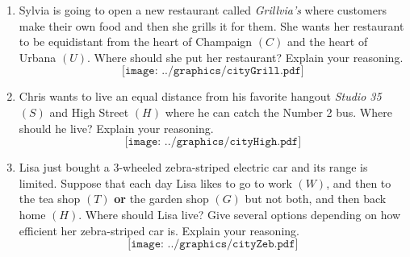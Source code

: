\begin{problems}
\begin{enumerate}
\item Sylvia is going to open a new restaurant called
  \textit{Grillvia's} where customers make their own food and then she
  grills it for them. She wants her restaurant to be equidistant from
  the heart of Champaign $(C)$ and the heart of Urbana $(U)$. Where
  should she put her restaurant?  Explain your reasoning.
\[
\texttt{[image: ../graphics/cityGrill.pdf]}
\]
\item Chris wants to live an equal distance from his favorite hangout
  \textit{Studio 35} $(S)$ and High Street $(H)$ where he can catch
  the Number 2 bus. Where should he live? Explain your reasoning.
\[
\texttt{[image: ../graphics/cityHigh.pdf]}
\]

\item Lisa just bought a 3-wheeled zebra-striped electric
  car and its range is limited. Suppose that each day Lisa likes to go
  to work $(W)$, and then to the tea shop $(T)$ \textbf{or} the garden
  shop $(G)$ but not both, and then back home $(H)$. Where should Lisa
  live? Give several options depending on how efficient her
  zebra-striped car is. Explain your reasoning.
\[
\texttt{[image: ../graphics/cityZeb.pdf]}
\]
\end{enumerate}
\end{problems}
